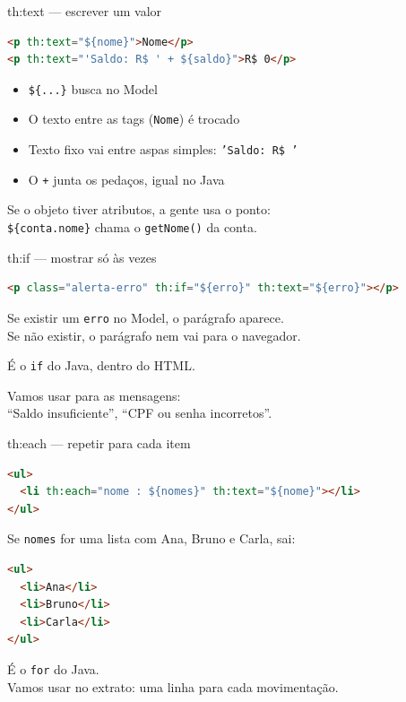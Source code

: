 \documentclass[aspectratio=169,11pt]{beamer}
\begin{document}
\begin{frame}[fragile]{th:text --- escrever um valor}
\begin{lstlisting}[language=HTML,basicstyle=\ttfamily\footnotesize]
<p th:text="${nome}">Nome</p>
<p th:text="'Saldo: R$ ' + ${saldo}">R$ 0</p>
\end{lstlisting}

  \vspace{0.4em}
  \begin{itemize}
    \item \texttt{\$\{...\}} busca no Model
    \item O texto entre as tags (\texttt{Nome}) é trocado
    \item Texto fixo vai entre aspas simples: \texttt{'Saldo: R\$ '}
    \item O \texttt{+} junta os pedaços, igual no Java
  \end{itemize}

  \vspace{0.4em}
  Se o objeto tiver atributos, a gente usa o ponto:\\
  \texttt{\$\{conta.nome\}} chama o \texttt{getNome()} da conta.
\end{frame}

\begin{frame}[fragile]{th:if --- mostrar só às vezes}
\begin{lstlisting}[language=HTML,basicstyle=\ttfamily\footnotesize]
<p class="alerta-erro" th:if="${erro}" th:text="${erro}"></p>
\end{lstlisting}

  \vspace{0.4em}
  Se existir um \texttt{erro} no Model, o parágrafo aparece.\\
  Se não existir, o parágrafo nem vai para o navegador.

  \vspace{0.5em}
  É o \texttt{if} do Java, dentro do HTML.

  \vspace{0.5em}
  Vamos usar para as mensagens:\\
  ``Saldo insuficiente'', ``CPF ou senha incorretos''.
\end{frame}

\begin{frame}[fragile]{th:each --- repetir para cada item}
\begin{lstlisting}[language=HTML,basicstyle=\ttfamily\footnotesize]
<ul>
  <li th:each="nome : ${nomes}" th:text="${nome}"></li>
</ul>
\end{lstlisting}

  Se \texttt{nomes} for uma lista com Ana, Bruno e Carla, sai:

\begin{lstlisting}[language=HTML,basicstyle=\ttfamily\footnotesize]
<ul>
  <li>Ana</li>
  <li>Bruno</li>
  <li>Carla</li>
</ul>
\end{lstlisting}

  É o \texttt{for} do Java.\\
  Vamos usar no extrato: uma linha para cada movimentação.
\end{frame}
\end{document}
